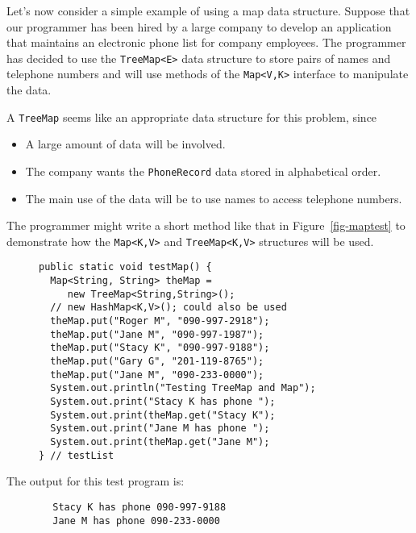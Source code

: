 Let's now consider a simple example of using a map data
structure. Suppose that our programmer has been hired by a large
company to develop an application that maintains an electronic phone
list for company employees.  The programmer has decided to use the
{\tt TreeMap<E>} data structure to store pairs of names and telephone
numbers and will use methods of the {\tt Map<V,K>} interface to
manipulate the data.  

\begin{minipage}{26pc}
A {\tt TreeMap} seems like an appropriate data
structure for this problem, since

\begin{itemize}
\item  {A large amount of data will be involved.}
\item  {The company wants the {\tt PhoneRecord} data stored in 
alphabetical order.}
\item  {The main use of the data will be to use names to access 
telephone numbers.}
\end{itemize}
\end{minipage}

\noindent The programmer might write a short method like that in
Figure~\ref{fig-maptest} to demonstrate how the {\tt Map<K,V>} and
{\tt TreeMap<K,V>} structures will be used.

\begin{figure}[tbh]
\jjjprogstart
\begin{jjjlisting}
\begin{lstlisting}
public static void testMap() {
  Map<String, String> theMap =
     new TreeMap<String,String>();
  // new HashMap<K,V>(); could also be used
  theMap.put("Roger M", "090-997-2918");
  theMap.put("Jane M", "090-997-1987");
  theMap.put("Stacy K", "090-997-9188");
  theMap.put("Gary G", "201-119-8765");
  theMap.put("Jane M", "090-233-0000");
  System.out.println("Testing TreeMap and Map");
  System.out.print("Stacy K has phone ");
  System.out.print(theMap.get("Stacy K");
  System.out.print("Jane M has phone ");
  System.out.print(theMap.get("Jane M");
} // testList
\end{lstlisting}
\end{jjjlisting}
\end{figure}


The output for this test program is:
\begin{jjjlisting}
\begin{lstlisting}
        Stacy K has phone 090-997-9188
        Jane M has phone 090-233-0000
\end{lstlisting}
\end{jjjlisting}

